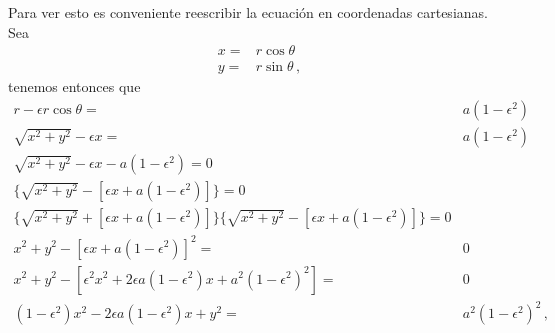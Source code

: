 \begin{frame}
Para ver esto es conveniente reescribir la ecuación en coordenadas cartesianas. Sea
\begin{align*}
  x=&r\cos\theta\\
  y=&r\sin\theta\,,
\end{align*}
tenemos entonces que
\begin{align}
\label{eq:conicacar}
r-\epsilon r\cos\theta=&a(1-\epsilon^2)\nonumber\\
\sqrt{x^2+y^2}-\epsilon x=&a(1-\epsilon^2)\nonumber\\
\sqrt{x^2+y^2}-\epsilon x-a(1-\epsilon^2)=0&\nonumber\\
\{\sqrt{x^2+y^2}-[\epsilon x+a(1-\epsilon^2)]\}=0&\nonumber\\
\{\sqrt{x^2+y^2}+[\epsilon x+a(1-\epsilon^2)]\}\{\sqrt{x^2+y^2}-[\epsilon x+a(1-\epsilon^2)]\}=0&\nonumber\\
x^2+y^2-[\epsilon x+a(1-\epsilon^2)]^2=&0\nonumber\\
x^2+y^2-[\epsilon^2 x^2+2\epsilon a(1-\epsilon^2)x+a^2(1-\epsilon^2)^2]=&0\nonumber\\
(1-\epsilon^2)x^2-2\epsilon a(1-\epsilon^2)x+y^2=&a^2(1-\epsilon^2)^2\,,
\end{align}
\end{frame}

